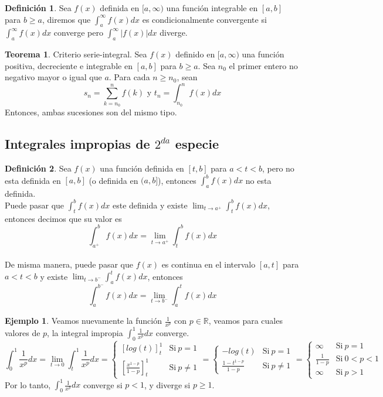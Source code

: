 \documentclass[10pt]{article}
\theoremstyle{definition}
\newtheorem{definition}{Definición}[section]
\newtheorem{theorem}{Teorema}[section]
\newtheorem{example}{Ejemplo}[section]
\begin{document}
\begin{definition}
	Sea $f(x)$ definida en $[a,\infty)$ una función integrable en $[a,b]$ para $b\ge a$, diremos que $\int_{a}^{\infty} f(x) dx$ es condicionalmente convergente si $\int_{a}^{\infty} f(x) dx$ converge pero $\int_{a}^{\infty} |f(x)| dx$ diverge.
\end{definition}
\begin{theorem}{Criterio serie-integral.}
	Sea $f(x)$ definido en $[a,\infty)$ una función positiva, decreciente e integrable en $[a,b]$ para $b\ge a$. Sea $n_0$ el primer entero no negativo mayor o igual que $a$. Para cada $n\ge n_0$, sean $$s_n=\sum_{k=n_0}^{n} f(k) \text{ y } t_n=\int_{n_0}^{n} f(x) dx$$
	Entonces, ambas sucesiones son del mismo tipo.
\end{theorem}
\newpage\subsection{Integrales impropias de $2^{da}$ especie}
\begin{definition}
	Sea $f(x)$ una función definida en $[t,b]$ para $a<t<b$, pero no esta definida en $[a,b]$ (o definida en $(a,b]$), entonces $\int_{a}^{b} f(x) dx$ no esta definida.
	\\Puede pasar que $\int_{t}^{b} f(x) dx$ este definida y existe $\lim_{t \to a^+} \int_{t}^{b} f(x) dx$, entonces  decimos que su valor es $$\int_{a^+}^{b} f(x) dx=\lim_{t \to a^+} \int_{t}^{b} f(x) dx$$
	\\De misma manera, puede pasar que $f(x)$ es continua en el intervalo $[a,t]$ para $a<t<b$ y existe $\lim_{t \to b^-}\int_{a}^{t} f(x) dx$, entonces $$\int_{a}^{b^-} f(x) dx=\lim_{t \to b^-} \int_{a}^{t} f(x) dx$$
\end{definition}
\begin{example}
	Veamos nuevamente la función $\frac{1}{x^p}$ con $p\in\mathbb{R}$, veamos para cuales valores de $p$, la integral impropia $\int_{0}^{1} \frac{1}{x^p} dx$ converge.
	$$\int _{0}^{1}\frac{1}{x^{p}} dx=\lim _{t\rightarrow 0}\int _{t}^{1}\frac{1}{x^{p}} dx=\begin{cases}
			[ log( t)]_{t}^{1}                       & \text{Si} \ p=1     \\
			\left[\frac{x^{1-p}}{1-p}\right]_{t}^{1} & \text{Si} \ p\neq 1
		\end{cases} =\begin{cases}
			-log( t)              & \text{Si} \ p=1     \\
			\frac{1-t^{1-p}}{1-p} & \text{Si} \ p\neq 1
		\end{cases} =\begin{cases}
			\infty        & \text{Si} \ p=1     \\
			\frac{1}{1-p} & \text{Si} \ 0< p< 1 \\
			\infty        & \text{Si} \  p>1
		\end{cases}$$
	Por lo tanto, $\int_{0}^{1} \frac{1}{x^p} dx$ converge si $p<1$, y diverge si $p\ge 1$.
\end{example}
\end{document}

